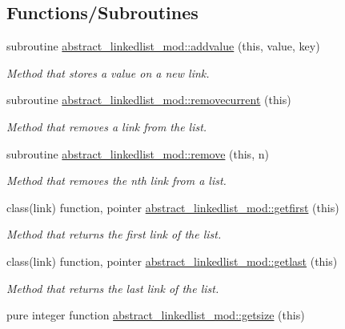 \subsection*{Functions/\+Subroutines}
\begin{DoxyCompactItemize}
\item 
subroutine \mbox{\hyperlink{namespaceabstract__linkedlist__mod_a1075e2f234dacc9daf8407e14fac0929}{abstract\+\_\+linkedlist\+\_\+mod\+::addvalue}} (this, value, key)
\begin{DoxyCompactList}\small\item\em Method that stores a value on a new link. \end{DoxyCompactList}\item 
subroutine \mbox{\hyperlink{namespaceabstract__linkedlist__mod_ae725ed63dd3b08d29e1c4ff824e05589}{abstract\+\_\+linkedlist\+\_\+mod\+::removecurrent}} (this)
\begin{DoxyCompactList}\small\item\em Method that removes a link from the list. \end{DoxyCompactList}\item 
subroutine \mbox{\hyperlink{namespaceabstract__linkedlist__mod_a9f4028744d1ca6536e28c76d2795ace3}{abstract\+\_\+linkedlist\+\_\+mod\+::remove}} (this, n)
\begin{DoxyCompactList}\small\item\em Method that removes the nth link from a list. \end{DoxyCompactList}\item 
class(link) function, pointer \mbox{\hyperlink{namespaceabstract__linkedlist__mod_ad7b7ffee891627ae2b0548001650f72b}{abstract\+\_\+linkedlist\+\_\+mod\+::getfirst}} (this)
\begin{DoxyCompactList}\small\item\em Method that returns the first link of the list. \end{DoxyCompactList}\item 
class(link) function, pointer \mbox{\hyperlink{namespaceabstract__linkedlist__mod_a7c0a2e5b554e8859fc9b4d8fb52b124f}{abstract\+\_\+linkedlist\+\_\+mod\+::getlast}} (this)
\begin{DoxyCompactList}\small\item\em Method that returns the last link of the list. \end{DoxyCompactList}\item 
pure integer function \mbox{\hyperlink{namespaceabstract__linkedlist__mod_ab4e548906863da517d7fedb02931b79f}{abstract\+\_\+linkedlist\+\_\+mod\+::getsize}} (this)

\end{DoxyCompactItemize}
